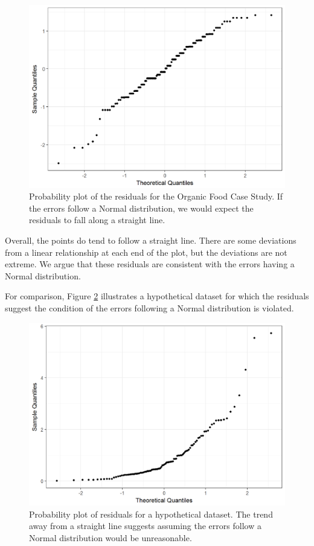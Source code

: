 \documentclass[]{book}
\theoremstyle{definition}
\theoremstyle{definition}
\theoremstyle{remark}
\begin{document}
\begin{figure}

{\centering \includegraphics[width=0.8\linewidth]{./Images/anovaassessment-normal-organic-1} 

}

\caption{Probability plot of the residuals for the Organic Food Case Study.  If the errors follow a Normal distribution, we would expect the residuals to fall along a straight line.}\label{fig:anovaassessment-normal-organic}
\end{figure}

Overall, the points do tend to follow a straight line. There are some
deviations from a linear relationship at each end of the plot, but the
deviations are not extreme. We argue that these residuals are consistent
with the errors having a Normal distribution.

For comparison, Figure \ref{fig:anovaassessment-normal-bad} illustrates
a hypothetical dataset for which the residuals suggest the condition of
the errors following a Normal distribution is violated.

\begin{figure}

{\centering \includegraphics[width=0.8\linewidth]{./Images/anovaassessment-normal-bad-1} 

}

\caption{Probability plot of residuals for a hypothetical dataset.  The trend away from a straight line suggests assuming the errors follow a Normal distribution would be unreasonable.}\label{fig:anovaassessment-normal-bad}
\end{figure}
\end{document}
